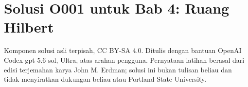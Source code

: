 
\section*{Solusi O001 untuk Bab 4: Ruang Hilbert}
\begin{center}
\small
Komponen solusi asli terpisah, CC BY-SA 4.0. Ditulis dengan bantuan
OpenAI Codex gpt-5.6-sol, Ultra, atas arahan pengguna. Pernyataan latihan
berasal dari edisi terjemahan karya John M. Erdman; solusi ini bukan tulisan
beliau dan tidak menyiratkan dukungan beliau atau Portland State University.
\end{center}


